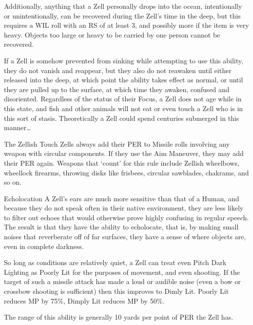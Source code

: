 \documentclass[oneside,11pt,english]{book}
\begin{document}
 

Additionally, anything that a Zell personally drops into the ocean, intentionally or 
unintentionally, can be recovered during the Zell's time in the deep, but this requires a WIL roll 
with an RS of at least 3, and possibly more if the item is very heavy. Objects too large or heavy to 
be carried by one person cannot be recovered. 

 

If a Zell is somehow prevented from sinking while attempting to use this ability, they do not 
vanish and reappear, but they also do not reawaken until either released into the deep, at which 
point the ability takes effect as normal, or until they are pulled up to the surface, at which time 
they awaken, confused and disoriented. Regardless of the status of their Focus, a Zell does not 
age while in this state, and fish and other animals will not eat or even touch a Zell who is in this 
sort of stasis. Theoretically a Zell could spend centuries submerged in this manner… 

 

The Zellish Touch 
Zells always add their PER to Missile rolls involving any weapon with circular components. If 
they use the Aim Maneuver, they may add their PER again. Weapons that ‘count’ for this rule 
include Zellish wheelbows, wheellock firearms, throwing disks like frisbees, circular sawblades, 
chakrams, and so on. 

 

Echolocation 
A Zell's ears are much more sensitive than that of a Human, and because they do not speak often 
in their native environment, they are less likely to filter out echoes that would otherwise prove 
highly confusing in regular speech. The result is that they have the ability to echolocate, that is, 
by making small noises that reverberate off of far surfaces, they have a sense of where objects 
are, even in complete darkness. 

 

So long as conditions are relatively quiet, a Zell can treat even Pitch Dark Lighting as Poorly Lit 
for the purposes of movement, and even shooting. If the target of such a missile attack has made a 
loud or audible noise (even a bow or crossbow shooting is sufficient) then this improves to Dimly 
Lit. Poorly Lit reduces MP by 75\%, Dimply Lit reduces MP by 50\%. 

 

The range of this ability is generally 10 yards per point of PER the Zell has. 
\end{document}
